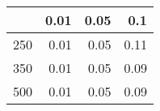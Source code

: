 % 
\begin{tabular}{rrrr}
  \hline
 & 0.01 & 0.05 & 0.1 \\ 
  \hline
250 & 0.01 & 0.05 & 0.11 \\ 
  350 & 0.01 & 0.05 & 0.09 \\ 
  500 & 0.01 & 0.05 & 0.09 \\ 
   \hline
\end{tabular}
